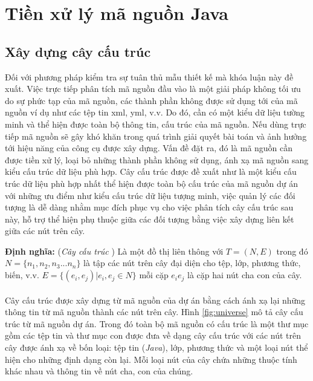 \documentclass[12pt]{report}
\begin{document}
\section{Tiền xử lý mã nguồn Java}
\subsection{Xây dựng cây cấu trúc}
Đối với phương pháp kiểm tra sự tuân thủ mẫu thiết kế mà khóa luận này đề xuất. Việc trực tiếp phân tích mã nguồn đầu vào là một giải pháp không tối ưu do sự phức tạp của mã nguồn, các thành phần không được sử dụng tới của mã nguồn ví dụ như các tệp tin xml, yml, v.v. Do đó, cần có một kiểu dữ liệu tường minh và thể hiện được toàn bộ thông tin, cấu trúc của mã nguồn. Nếu dùng trực tiếp mã nguồn sẽ gây khó khăn trong quá trình giải quyết bài toán và ảnh hưởng tới hiệu năng của công cụ được xây dựng. Vấn đề đặt ra, đó là mã nguồn cần được tiền xử lý, loại bỏ những thành phần không sử dụng, ánh xạ mã nguồn sang kiểu cấu trúc dữ liệu phù hợp. Cây cấu trúc được đề xuất như là một kiểu cấu trúc dữ liệu phù hợp nhất thể hiện được toàn bộ cấu trúc của mã nguồn dự án với những ưu điểm như kiểu cấu trúc dữ liệu tượng minh, việc quản lý các đối tượng là dễ dàng nhằm mục đích phục vụ cho việc phân tích cây cấu trúc sau này, hỗ trợ thể hiện phụ thuộc giữa các đối tượng bằng việc xây dựng liên kết giữa các nút trên cây.

\noindent \textbf{Định nghĩa: }(\textit{Cây cấu trúc} \cite{jcia}) Là một đồ thị liên thông với $T = (N,E)$ trong đó $N = \{n_1,n_2,n_3...n_n \}$ là tập các nút trên cây đại diện cho tệp, lớp, phương thức, biến, v.v. $E = \{(e_i,e_j) | e_i, e_j \in N \}$ mỗi cặp $e_ie_j$ là cặp hai nút cha con của cây.\\\\
Cây cấu trúc được xây dựng từ mã nguồn của dự án bằng cách ánh xạ lại những thông tin từ mã nguồn thành các nút trên cây. Hình \ref{fig:universe} mô tả cây cấu trúc từ mã nguồn dự án. Trong đó toàn bộ mã nguồn có cấu trúc là một thư mục gồm các tệp tin và thư mục con được đưa về dạng cây cấu trúc với các nút trên cây được ánh xạ về bốn loại: tệp tin (\textit{Java}), lớp, phương thức và một loại nút thể hiện cho những định dạng còn lại. Mỗi loại nút của cây chứa những thuộc tính khác nhau và thông tin về nút cha, con của chúng.
\end{document}
